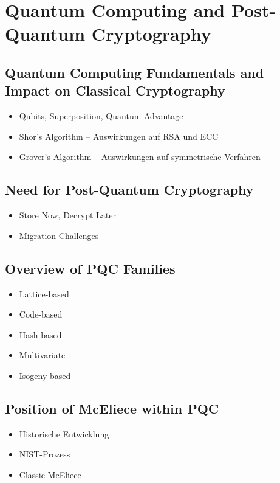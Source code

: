 \documentclass[a4paper,11pt]{article}
\begin{document}
\section{Quantum Computing and Post-Quantum Cryptography}

\subsection{Quantum Computing Fundamentals and Impact on Classical Cryptography}
\begin{itemize}
	\item Qubits, Superposition, Quantum Advantage
	\item Shor's Algorithm -- Auswirkungen auf RSA und ECC
	\item Grover's Algorithm -- Auswirkungen auf symmetrische Verfahren
\end{itemize}

\subsection{Need for Post-Quantum Cryptography}
\begin{itemize}
	\item Store Now, Decrypt Later
	\item Migration Challenges
\end{itemize}

\subsection{Overview of PQC Families}
\begin{itemize}
	\item Lattice-based
	\item Code-based
	\item Hash-based
	\item Multivariate
	\item Isogeny-based
\end{itemize}

\subsection{Position of McEliece within PQC}
\begin{itemize}
	\item Historische Entwicklung
	\item NIST-Prozess
	\item Classic McEliece
\end{itemize}
\end{document}

